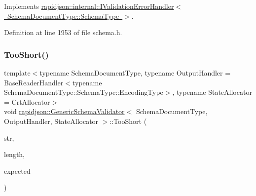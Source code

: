 Implements \mbox{\hyperlink{classrapidjson_1_1internal_1_1_i_validation_error_handler_af2cb1441d41085df755231be01964b5d}{rapidjson\+::internal\+::\+I\+Validation\+Error\+Handler$<$ Schema\+Document\+Type\+::\+Schema\+Type $>$}}.



Definition at line 1953 of file schema.\+h.


\begin{DoxyCode}{0}

\end{DoxyCode}
\mbox{\label{classrapidjson_1_1_generic_schema_validator_aed41fec37abd2543621b0838718436cd}} 
\subsubsection{\texorpdfstring{TooShort()}{TooShort()}}
{\footnotesize\ttfamily template$<$typename Schema\+Document\+Type, typename Output\+Handler = Base\+Reader\+Handler$<$typename Schema\+Document\+Type\+::\+Schema\+Type\+::\+Encoding\+Type$>$, typename State\+Allocator = Crt\+Allocator$>$ \\
void \mbox{\hyperlink{classrapidjson_1_1_generic_schema_validator}{rapidjson\+::\+Generic\+Schema\+Validator}}$<$ Schema\+Document\+Type, Output\+Handler, State\+Allocator $>$\+::Too\+Short (\begin{DoxyParamCaption}\item[{const \mbox{\hyperlink{classrapidjson_1_1_generic_schema_validator_ab5b7093443e29cf66eb7cf47f3d8583d}{Ch}} $\ast$}]{str,  }\item[{\mbox{\hyperlink{namespacerapidjson_a44eb33eaa523e36d466b1ced64b85c84}{Size\+Type}}}]{length,  }\item[{\mbox{\hyperlink{namespacerapidjson_a44eb33eaa523e36d466b1ced64b85c84}{Size\+Type}}}]{expected }\end{DoxyParamCaption})}



